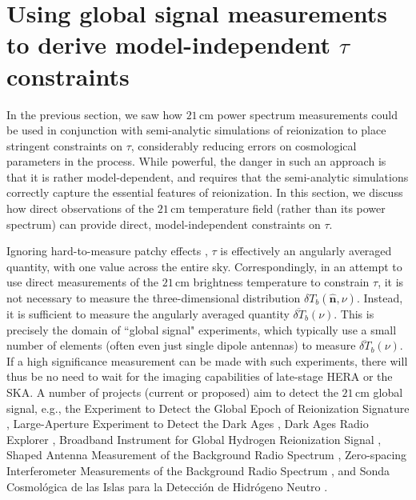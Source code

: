 \documentclass[twocolumn,aps,prd,nofootinbib,showpacs]{revtex4-1}
\begin{document}
\section{Using global signal measurements to derive model-independent $\tau$ constraints}
\label{sec:GlobalSig}

In the previous section, we saw how $21\,\textrm{cm}$ power spectrum measurements could be used in conjunction with semi-analytic simulations of reionization to place stringent constraints on $\tau$, considerably reducing errors on cosmological parameters in the process. While powerful, the danger in such an approach is that it is rather model-dependent, and requires that the semi-analytic simulations correctly capture the essential features of reionization. In this section, we discuss how direct observations of the $21\,\textrm{cm}$ temperature field (rather than its power spectrum) can provide direct, model-independent constraints on $\tau$.

Ignoring hard-to-measure patchy effects \cite{dvorkin_et_al2009,su_et_al2011}, $\tau$ is effectively an angularly averaged quantity, with one value across the entire sky. Correspondingly, in an attempt to use direct measurements of the $21\,\textrm{cm}$ brightness temperature to constrain $\tau$, it is not necessary to measure the three-dimensional distribution $\delta T_b (\mathbf{\hat{n}}, \nu)$. Instead, it is sufficient to measure the angularly averaged quantity $\overline{\delta T}_b (\nu)$. This is precisely the domain of ``global signal" experiments, which typically use a small number of elements (often even just single dipole antennas) to measure $\overline{\delta T}_b (\nu)$. If a high significance measurement can be made with such experiments, there will thus be no need to wait for the imaging capabilities of late-stage HERA or the SKA. A number of projects (current or proposed) aim to detect the $21\,\textrm{cm}$ global signal, e.g., the Experiment to Detect the Global Epoch of Reionization Signature \citep{bowman2010}, Large-Aperture Experiment to Detect the Dark Ages \citep{greenhill2012}, Dark Ages Radio Explorer \citep{burns2012}, Broadband Instrument for Global Hydrogen Reionization Signal \cite{Sokolowski_et_al2015}, Shaped Antenna Measurement of the Background Radio Spectrum \cite{patra_et_al2013}, Zero-spacing Interferometer Measurements of the Background Radio Spectrum \cite{mahesh_et_al2014}, and Sonda Cosmol\'{o}gica de las Islas para la Detecci\'{o}n de Hidr\'{o}geno Neutro \citep{voytek2014}.
\end{document}
